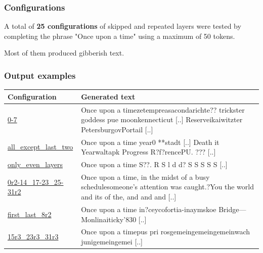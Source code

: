 \documentclass{beamer}
\begin{document}
\begin{frame}
  \frametitle{Configurations}
  A total of \textbf{25 configurations} of skipped and repeated layers were tested by completing the phrase "Once upon a time" using a maximum of 50 tokens.

  Most of them produced gibberish text.
\end{frame}

\begin{frame}
  \frametitle{Output examples}
  \begin{table}[h]
    \centering
    \begin{tabular}{|l|p{}|}
        \hline
        \textbf{Configuration} & \textbf{Generated text} \\ \hline
        \small \url{0-7} & {\small Once upon a timezetempreasacondarichte?? trickster goddess pue moonkennecticut [..] Reserveikaiwitzter PetersburgovPortail [..]} \\ \hline
        \small \url{all_except_last_two} & {\small Once upon a time year0 **stadt [..] Death it Yearwaltapk Progress R?f?rencePU. ??? [..]} \\ \hline
        \small \url{only_even_layers} & {\small Once upon a time S??. R S l d d? S S S S S [..]} \\ \hline
        \small \url{0r2-14_17-23_25-31r2} & {\small Once upon a time, in the midst of a busy schedulesomeone's attention was caught.?You the world and its of the, and and and [..]} \\ \hline
        \small \url{first_last_8r2} &{\small Once upon a time in?ceycofortia-inaymskoe Bridge---Monlinaiticky'830 [..]} \\ \hline
        \small \url{15r3_23r3_31r3} &{\small Once upon a timepus pri rosgemeingemeingemeinwach junigemeingemei [..]} \\ \hline
      \end{tabular}
    \label{tab:generated_text}
  \end{table}
\end{frame}
\end{document}
